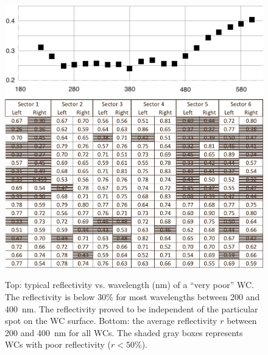 \begin{figure}[!ht]
	\centering
	\includegraphics[width=0.98\columnwidth,keepaspectratio]{img/winstoConeSample2Reflectivity.png}
	\includegraphics[width=0.98\columnwidth,keepaspectratio]{img/wcStatusBefore.png}
	\caption{Top: typical reflectivity vs. wavelength (nm) of a ``very poor'' WC. The reflectivity is below 30\% for
          most wavelengths between 200 and 400~nm. The reflectivity proved to be independent of the particular spot
          on the WC surface. Bottom: the average reflectivity $r$ between 200 and 400~nm for all WCs. The shaded
          gray boxes represents WCs with poor reflectivity ($r < 50$\%).}
	\label{fig:wcStatusBefore}
\end{figure}
